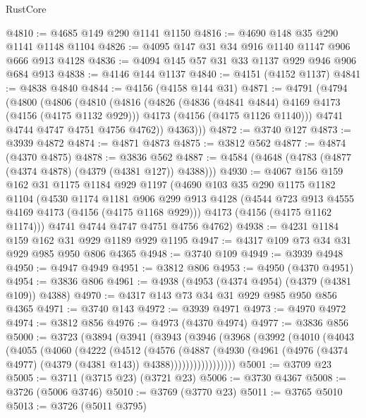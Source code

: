 \begin{lexlean}{RustCore}
\begin{coremodule}
@4810 := @4685 @149 @290 @1141 @1150
@4816 := @4690 @148 @35 @290 @1141 @1148 @1104
@4826 := @4095 @147 @31 @34 @916 @1140 @1147 @906 @666 @913 @4128
@4836 := @4094 @145 @57 @31 @33 @1137 @929 @946 @906 @684 @913
@4838 := @4146 @144 @1137
@4840 := @4151 (@4152 @1137)
@4841 := @4838 @4840
@4844 := @4156 (@4158 @144 @31)
@4871 := @4791
    (@4794
      (@4800
        (@4806
          (@4810
            (@4816
              (@4826
                (@4836 (@4841 @4844) @4169 @4173 (@4156 (@4175 @1132 @929)))
                @4173
                (@4156 (@4175 @1126 @1140)))
              @4741
              @4744
              @4747
              @4751
              @4756
              @4762))
          @4363)))
@4872 := @3740 @127
@4873 := @3939 @4872
@4874 := @4871 @4873
@4875 := @3812 @562
@4877 := @4874 (@4370 @4875)
@4878 := @3836 @562
@4887 := @4584 (@4648 (@4783 (@4877 (@4374 @4878) (@4379 (@4381 @127)) @4388)))
@4930 := @4067
    @156
    @159
    @162
    @31
    @1175
    @1184
    @929
    @1197
    (@4690
      @103
      @35
      @290
      @1175
      @1182
      @1104
      (@4530
        @1174
        @1181
        @906
        @299
        @913
        @4128
        (@4544 @723 @913 @4555 @4169 @4173 (@4156 (@4175 @1168 @929)))
        @4173
        (@4156 (@4175 @1162 @1174)))
      @4741
      @4744
      @4747
      @4751
      @4756
      @4762)
@4938 := @4231 @1184 @159 @162 @31 @929 @1189 @929 @1195
@4947 := @4317 @109 @73 @34 @31 @929 @985 @950 @806 @4365
@4948 := @3740 @109
@4949 := @3939 @4948
@4950 := @4947 @4949
@4951 := @3812 @806
@4953 := @4950 (@4370 @4951)
@4954 := @3836 @806
@4961 := @4938 (@4953 (@4374 @4954) (@4379 (@4381 @109)) @4388)
@4970 := @4317 @143 @73 @34 @31 @929 @985 @950 @856 @4365
@4971 := @3740 @143
@4972 := @3939 @4971
@4973 := @4970 @4972
@4974 := @3812 @856
@4976 := @4973 (@4370 @4974)
@4977 := @3836 @856
@5000 := @3723
    (@3894
      (@3941
        (@3943
          (@3946
            (@3968
              (@3992
                (@4010
                  (@4043
                    (@4055
                      (@4060
                        (@4222
                          (@4512
                            (@4576
                              (@4887
                                (@4930
                                  (@4961
                                    (@4976 (@4374 @4977) (@4379 (@4381 @143)) @4388)))))))))))))))))
@5001 := @3709 @23
@5005 := @3711 (@3715 @23) (@3721 @23)
@5006 := @3730 @4367
@5008 := @3726 (@5006 @3746)
@5010 := @3769 (@3770 @23)
@5011 := @3765 @5010
@5013 := @3726 (@5011 @3795)

\end{coremodule}
\end{lexlean}
